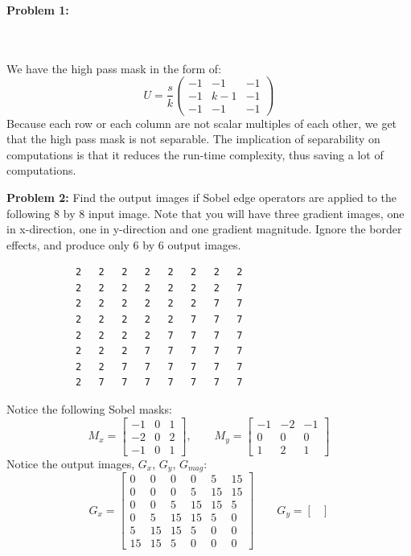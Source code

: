 \documentclass[11pt]{article}
\newenvironment{problem}[1]{\textbf{Problem #1: }}{\newpage}
\begin{document}
\begin{problem}{1}
\begin{enumerate}[label = (\alph*)]
			\\ \\
			We have the high pass mask in the form of:
			\[U = \frac{s}{k}\begin{pmatrix}
				-1 & -1 & -1 \\ -1 & k - 1 & -1 \\ -1 & -1 & -1
			\end{pmatrix}\]
			Because each row or each column are not scalar multiples of each other, we get that the high pass mask is not separable.  The implication of separability on computations is that it reduces the run-time complexity, thus saving a lot of computations.
		\end{enumerate}
	\end{problem}

	\begin{problem}{2}
		Find the output images if Sobel edge operators are applied to the following 8 by 8 input image.  Note that you will have three gradient images, one in x-direction, one in y-direction and one gradient magnitude. Ignore the border effects, and produce only 6 by 6 output images.
		\begin{verbatim}
			2   2   2   2   2   2   2   2
			2   2   2   2   2   2   2   7
			2   2   2   2   2   2   7   7
			2   2   2   2   2   7   7   7
			2   2   2   2   7   7   7   7
			2   2   2   7   7   7   7   7
			2   2   7   7   7   7   7   7 
			2   7   7   7   7   7   7   7	
		\end{verbatim}
		Notice the following Sobel masks:
		\[M_x = \begin{bmatrix}
			-1 & 0 & 1 \\ -2 & 0 & 2 \\ -1 & 0 & 1
		\end{bmatrix}, \qquad M_y = \begin{bmatrix}
			-1 & -2 & -1 \\ 0 & 0 & 0 \\ 1 & 2 & 1 
		\end{bmatrix}\]
		Notice the output images, $G_x$, $G_y$, $G_{mag}$:
		\[G_x = \begin{bmatrix}
			0 & 0 & 0 & 0 & 5 & 15 \\
			0 & 0 & 0 & 5 & 15 & 15 \\
			0 & 0 & 5 & 15 & 15 & 5 \\
			0 & 5 & 15 & 15 & 5 & 0 \\
			5 & 15 & 15 & 5 & 0 & 0 \\
			15 & 15 & 5 & 0 & 0 & 0
		\end{bmatrix} \qquad G_y = \begin{bmatrix}

\end{bmatrix}\]
\end{problem}
\end{document}
